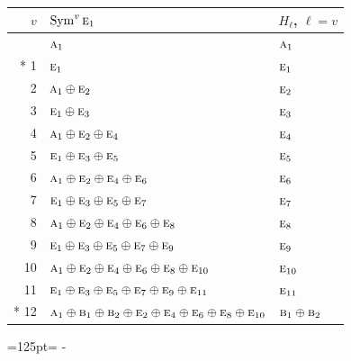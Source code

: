 \documentclass[10pt,a4paper]{article}
\newcommand{\needspace}[1]{\par\penalty-100\begingroup\dimen0=#1\relax\dimen2=\pagegoal
  \advance\dimen2-\pagetotal\ifdim\dimen0>\dimen2\relax\ifdim\dimen2>0pt\vfil\break\fi\fi
  \endgroup}
\numberwithin{equation}{section}
\newcommand{\irr}[1]{\text{\normalfont\scshape #1}}
\begin{document}
{\small\begin{longtable}{@{}rll@{}}\toprule
$v$ & $\operatorname{Sym}^{v}\irr{e}_{1}$ & $H_\ell$, $\ell = v$\\\midrule\endhead
\bottomrule\endfoot\endlastfoot
0 & $\irr{a}_{1}$ & $\irr{a}_{1}$\\*
1 & $\irr{e}_{1}$ & $\irr{e}_{1}$\\
2 & $\irr{a}_{1} \oplus \irr{e}_{2}$ & $\irr{e}_{2}$\\
3 & $\irr{e}_{1} \oplus \irr{e}_{3}$ & $\irr{e}_{3}$\\
4 & $\irr{a}_{1} \oplus \irr{e}_{2} \oplus \irr{e}_{4}$ & $\irr{e}_{4}$\\
5 & $\irr{e}_{1} \oplus \irr{e}_{3} \oplus \irr{e}_{5}$ & $\irr{e}_{5}$\\
6 & $\irr{a}_{1} \oplus \irr{e}_{2} \oplus \irr{e}_{4} \oplus \irr{e}_{6}$ & $\irr{e}_{6}$\\
7 & $\irr{e}_{1} \oplus \irr{e}_{3} \oplus \irr{e}_{5} \oplus \irr{e}_{7}$ & $\irr{e}_{7}$\\
8 & $\irr{a}_{1} \oplus \irr{e}_{2} \oplus \irr{e}_{4} \oplus \irr{e}_{6} \oplus \irr{e}_{8}$ & $\irr{e}_{8}$\\
9 & $\irr{e}_{1} \oplus \irr{e}_{3} \oplus \irr{e}_{5} \oplus \irr{e}_{7} \oplus \irr{e}_{9}$ & $\irr{e}_{9}$\\
10 & $\irr{a}_{1} \oplus \irr{e}_{2} \oplus \irr{e}_{4} \oplus \irr{e}_{6} \oplus \irr{e}_{8} \oplus \irr{e}_{10}$ & $\irr{e}_{10}$\\
11 & $\irr{e}_{1} \oplus \irr{e}_{3} \oplus \irr{e}_{5} \oplus \irr{e}_{7} \oplus \irr{e}_{9} \oplus \irr{e}_{11}$ & $\irr{e}_{11}$\\*
12 & $\irr{a}_{1} \oplus \irr{b}_{1} \oplus \irr{b}_{2} \oplus \irr{e}_{2} \oplus \irr{e}_{4} \oplus \irr{e}_{6} \oplus \irr{e}_{8} \oplus \irr{e}_{10}$ & $\irr{b}_{1} \oplus \irr{b}_{2}$\\
\bottomrule\end{longtable}}
\needspace{125pt}
\end{document}
